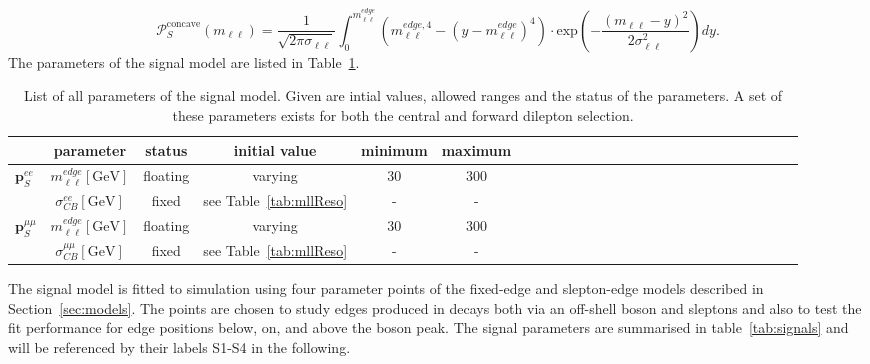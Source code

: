 \begin{equation}
 {\mathcal{P}}_{S}^{\text{concave}}(m_{\ell\ell}) = \frac{1}{\sqrt{2\pi\sigma_{\ell\ell}}} \int_{0}^{m_{\ell\ell}^{edge}} (m_{\ell\ell}^{edge,4} -(y-m_{\ell\ell}^{edge})^4) \cdot \textrm{exp}\left( -\frac{(m_{\ell\ell}-y)^2}{2\sigma_{\ell\ell}^{2}}\right) dy.
\end{equation}
The parameters of the signal model are listed in Table~\ref{tab:Fit_Par_Overview_Sig}.
\begin{table}[htbp]
\begin{center}
 \renewcommand{\arraystretch}{1.3}
 \caption{List of all parameters of the signal model. Given are intial values, allowed ranges and the status of the parameters. A set of these parameters exists for both the central and forward dilepton selection.\label{tab:Fit_Par_Overview_Sig}}
\begin{tabular}{l|c|c|c|c|ccccccccccccccccccccc}
& parameter & status & initial value & minimum & maximum \\ \hline
\multirow{2}{*}{$\mathbf{p}_{S}^{ee}$} & $m_{\ell\ell}^{edge} [\mathrm{GeV}]$ & floating & varying & 30 & 300 \\ 
& $\sigma_{CB}^{ee}  [\mathrm{GeV}]$ & fixed & see Table~\ref{tab:mllReso} & - & - \\ \hline
\multirow{2}{*}{$\mathbf{p}_{S}^{\mu\mu}$} & $m_{\ell\ell}^{edge} [\mathrm{GeV}]$ & floating & varying & 30 & 300 \\ 
& $\sigma_{CB}^{\mu\mu}  [\mathrm{GeV}]$ & fixed & see Table~\ref{tab:mllReso} & - & - \\
\end{tabular}

\end{center}
\end{table}

The signal model is fitted to simulation using four parameter points of the fixed-edge and slepton-edge models described in Section~\ref{sec:models}. The points are chosen to study edges produced in decays both via an off-shell \Z boson and sleptons and also to test the fit performance for edge positions below, on, and above the \Z boson peak. The signal parameters are summarised in table~\ref{tab:signals} and will be referenced by their labels S1-S4 in the following.

